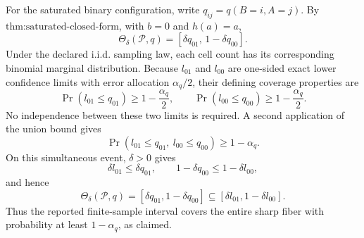For the saturated binary configuration, write \(q_{ij}=q(B=i,A=j)\).  By \(\text{thm:saturated-closed-form}\), with \(b=0\) and \(h(a)=a\),
\[
\Theta_\delta(\mathcal P,q)=[\delta q_{01},\,1-\delta q_{00}].
\]
Under the declared i.i.d. sampling law, each cell count has its corresponding binomial marginal distribution.  Because \(l_{01}\) and \(l_{00}\) are one-sided exact lower confidence limits with error allocation \(\alpha_q/2\), their defining coverage properties are
\[
\Pr(l_{01}\leq q_{01})\geq1-\frac{\alpha_q}{2},
\qquad
\Pr(l_{00}\leq q_{00})\geq1-\frac{\alpha_q}{2}.
\]
No independence between these two limits is required.  A second application of the union bound gives
\[
\Pr(l_{01}\leq q_{01},\ l_{00}\leq q_{00})\geq1-\alpha_q.
\]
On this simultaneous event, \(\delta>0\) gives
\[
\delta l_{01}\leq\delta q_{01},
\qquad
1-\delta q_{00}\leq1-\delta l_{00},
\]
and hence
\[
\Theta_\delta(\mathcal P,q)
=[\delta q_{01},1-\delta q_{00}]
\subseteq[\delta l_{01},1-\delta l_{00}].
\]
Thus the reported finite-sample interval covers the entire sharp fiber with probability at least \(1-\alpha_q\), as claimed.

